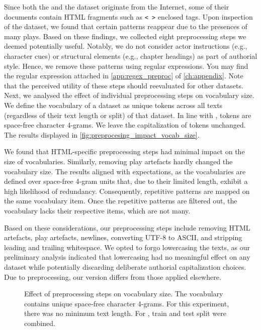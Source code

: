 Since both the \dataBlog{} and the \dataPan{} dataset originate from the Internet, some of their documents contain HTML fragments such as \texttt{< >} enclosed tags.
Upon inspection of the \dataGutenberg{} dataset, we found that certain patterns reappear due to the presences of many plays.
Based on these findings, we collected eight preprocessing steps we deemed potentially useful. 
Notably, we do not consider actor instructions (e.g., character cues) or structural elements (e.g., chapter headings) as part of authorial style.
Hence, we remove these patterns using regular expressions.
You may find the regular expression attached in \autoref{app:regex_preproc} of \autoref{ch:appendix}.
Note that the perceived utility of these steps should reevaluated for other datasets.
Next, we analysed the effect of individual preprocessing steps on vocabulary size.  
We define the vocabulary of a dataset as unique tokens across all texts (regardless of their text length or split) of that dataset.
In line with \citep{koppel_determining_2014}, tokens are space-free character 4-grams.
We leave the capitalization of tokens unchanged. 
The results displayed in \autoref{fig:preprocesing_impact_vocab_size}.

We found that HTML-specific preprocessing steps had minimal impact on the size of vocabularies.
Similarly, removing play artefacts hardly changed the vocabulary size.
The results aligned with expectations, as the vocabularies are defined over space-free 4-gram units that, due to their limited length, exhibit a high likelihood of redundancy.
Consequently, repetitive patterns are mapped on the same vocabulary item.
Once the repetitive patterns are filtered out, the vocabulary lacks their respective items, which are not many.

Based on these considerations, our preprocessing steps include removing HTML artefacts, play artefacts, newlines, converting UTF-8 to ASCII, and stripping leading and trailing whitespace.
We opted to forgo lowercasing the texts, as our preliminary analysis indicated that lowercasing had no meaningful effect on any dataset while potentially discarding deliberate authorial capitalization choices.
Due to preprocessing, our \dataPan{} version differs from those applied elsewhere.

\begin{figure}[htbp]
    \centering
    
    \caption[Effect of preprocessing steps on vocabulary size.]{Effect of preprocessing steps on vocabulary size. The vocabulary contains unique space-free character 4-grams.
    For this experiment, there was no minimum text length.
    For \dataPan{}, train and test split were combined.}
    \label{fig:preprocesing_impact_vocab_size}
\end{figure}


